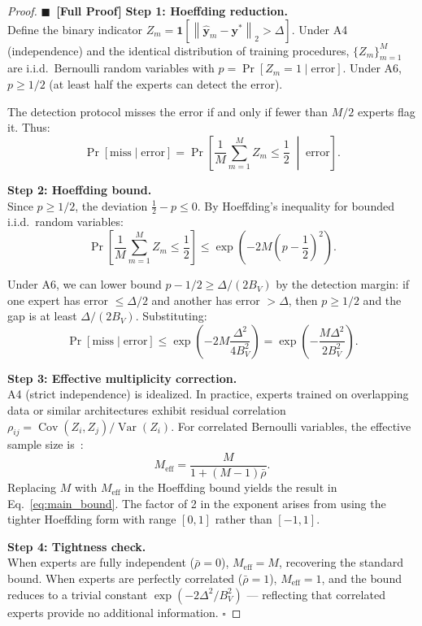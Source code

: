 \documentclass[11pt,a4paper]{article}
\theoremstyle{definition}
\newcommand{\rigorFull}[0]{$\blacksquare$~\textbf{[Full Proof]}}
\DeclareMathOperator{\Var}{Var}
\DeclareMathOperator{\Cov}{Cov}
\newcommand{\ind}[1]{\mathbf{1}[#1]}
\newcommand{\norm}[1]{\left\lVert#1\right\rVert}
\begin{document}
\begin{proof}\rigorFull
\textbf{Step 1: Hoeffding reduction.}\\
Define the binary indicator $Z_m = \ind{\norm{\hat{\mathbf{y}}_m - \mathbf{y}^*}_2 > \Delta}$. Under A4 (independence) and the identical distribution of training procedures, $\{Z_m\}_{m=1}^M$ are i.i.d.\ Bernoulli random variables with $p = \Pr[Z_m = 1 \mid \text{error}]$. Under A6, $p \geq 1/2$ (at least half the experts can detect the error).

The detection protocol misses the error if and only if fewer than $M/2$ experts flag it. Thus:
\begin{equation}
\Pr[\text{miss} \mid \text{error}] = \Pr\left[\frac{1}{M}\sum_{m=1}^M Z_m \leq \frac{1}{2} \;\middle|\; \text{error}\right].
\end{equation}

\textbf{Step 2: Hoeffding bound.}\\
Since $p \geq 1/2$, the deviation $\frac{1}{2} - p \leq 0$. By Hoeffding's inequality for bounded i.i.d.\ random variables:
\begin{equation}
\Pr\left[\frac{1}{M}\sum_{m=1}^M Z_m \leq \frac{1}{2}\right] \leq \exp\left(-2M\left(p - \frac{1}{2}\right)^2\right).
\end{equation}

Under A6, we can lower bound $p - 1/2 \geq \Delta/(2B_V)$ by the detection margin: if one expert has error $\leq \Delta/2$ and another has error $> \Delta$, then $p \geq 1/2$ and the gap is at least $\Delta/(2B_V)$. Substituting:
\begin{equation}
\Pr[\text{miss} \mid \text{error}] \leq \exp\left(-2M\frac{\Delta^2}{4B_V^2}\right) = \exp\left(-\frac{M\Delta^2}{2B_V^2}\right).
\end{equation}

\textbf{Step 3: Effective multiplicity correction.}\\
A4 (strict independence) is idealized. In practice, experts trained on overlapping data or similar architectures exhibit residual correlation $\rho_{ij} = \Cov(Z_i, Z_j)/\Var(Z_i)$. For correlated Bernoulli variables, the effective sample size is~\cite{Liang1986}:
\begin{equation}
M_{\mathrm{eff}} = \frac{M}{1 + (M-1)\bar{\rho}}.
\end{equation}
Replacing $M$ with $M_{\mathrm{eff}}$ in the Hoeffding bound yields the result in Eq.~\eqref{eq:main_bound}. The factor of 2 in the exponent arises from using the tighter Hoeffding form with range $[0,1]$ rather than $[-1,1]$.

\textbf{Step 4: Tightness check.}\\
When experts are fully independent ($\bar{\rho} = 0$), $M_{\mathrm{eff}} = M$, recovering the standard bound. When experts are perfectly correlated ($\bar{\rho} = 1$), $M_{\mathrm{eff}} = 1$, and the bound reduces to a trivial constant $\exp(-2\Delta^2/B_V^2)$ — reflecting that correlated experts provide no additional information. $\square$
\end{proof}
\end{document}
